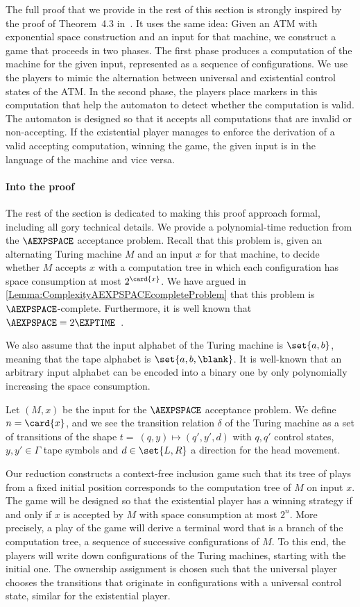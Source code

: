 \documentclass[../../diss.tex]{subfiles}
\begin{document}
The full proof that we provide in the rest of this section is strongly inspired by the proof of Theorem~4.3 in~\cite{MuschollSS06}.
It uses the same idea:
Given an ATM with exponential space construction and an input for that machine, we construct a game that proceeds in two phases.
The first phase produces a computation of the machine for the given input, represented as a sequence of configurations.
We use the players to mimic the alternation between universal and existential control states of the ATM.\@
In the second phase, the players place markers in this computation that help the automaton to detect whether the computation is valid.
The automaton is designed so that it accepts all computations that are invalid or non-accepting.
If the existential player manages to enforce the derivation of a valid accepting computation, winning the game, the given input is in the language of the machine and vice versa.

\paragraph{Into the proof}

The rest of the section is dedicated to making this proof approach formal, including all gory technical details.
We provide a polynomial-time reduction from the $\AEXPSPACE$ acceptance problem.
Recall that this problem is, given an alternating Turing machine $M$ and an input $x$ for that machine, to decide whether $M$ accepts $x$ with a computation tree in which each configuration has space consumption at most $2^{\card{x}}$.
We have argued in \cref{Lemma:ComplexityAEXPSPACEcompleteProblem} that this problem is $\AEXPSPACE$-complete.
Furthermore, it is well known that $\AEXPSPACE = 2\EXPTIME$~\cite{ChandraKS81}.

We also assume that the input alphabet of the Turing machine is $\set{a,b}$, meaning that the tape alphabet is $\set{a,b,\blank}$.
It is well-known that an arbitrary input alphabet can be encoded into a binary one by only polynomially increasing the space consumption.

Let $(M,x)$ be the input for the $\AEXPSPACE$ acceptance problem.
We define $n = \card{x}$, and we see the transition relation $\delta$ of the Turing machine as a set of transitions of the shape $t = \  (q,y) \mapsto (q',y',d)$ with $q,q'$ control states, $y,y' \in \Gamma$ tape symbols and $d \in \set{L,R}$ a direction for the head movement.

Our reduction constructs a context-free inclusion game such that its tree of plays from a fixed initial position corresponds to the computation tree of $M$ on input $x$.
The game will be designed so that the existential player has a winning strategy if and only if $x$ is accepted by $M$ with space consumption at most $2^n$.
More precisely, a play of the game will derive a terminal word that is a branch of the computation tree, \ie a sequence of successive configurations of $M$.
To this end, the players will write down configurations of the Turing machines, starting with the initial one.
The ownership assignment is chosen such that the universal player chooses the transitions that originate in configurations with a universal control state, similar for the existential player.
\end{document}
